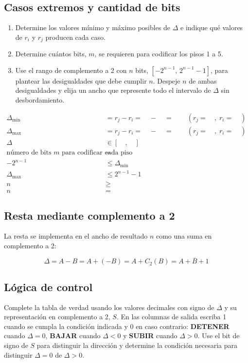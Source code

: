 \documentclass[11pt]{article}
\begin{document}
\subsection{Casos extremos y cantidad de bits}
\label{sec:orgb88aa3c}
\begin{enumerate}
\item Determine los valores mínimo y máximo posibles de \(\Delta\) e indique
qué valores de \(r_i\) y \(r_j\) producen cada caso.
\item Determine cuántos bits, \(m\), se requieren para codificar los pisos
1 a 5.
\item Use el rango de complemento a 2 con \(n\) bits,
\([-2^{n-1},\,2^{n-1}-1]\), para plantear las desigualdades que debe
cumplir \(n\). Despeje \(n\) de ambas desigualdades y elija un ancho que
represente todo el intervalo de \(\Delta\) sin desbordamiento.
\end{enumerate}

\begin{align*}
  \Delta_{\min} &= r_j-r_i = \quad-\quad = \quad
    \quad (r_j=\quad,\;r_i=\quad) \\
  \Delta_{\max} &= r_j-r_i = \quad-\quad = \quad
    \quad (r_j=\quad,\;r_i=\quad) \\
  \Delta &\in [\quad,\quad] \\
  \text{número de bits }m\text{ para codificar cada piso} &= \\
  -2^{n-1} &\leq \Delta_{\min} \\
  \Delta_{\max} &\leq 2^{n-1}-1 \\
  n &\geq \quad \\
  n &= \quad
\end{align*}

\subsection{Resta mediante complemento a 2}
\label{sec:orgf60a915}
La resta se implementa en el ancho de resultado \(n\) como una suma en
complemento a 2:


\begin{equation}
  \label{eq:resta-complemento-dos}
  \Delta = A-B = A+(-B)=A+C_2(B)=A+\overline{B}+1
\end{equation}

\subsection{Lógica de control}
\label{sec:org7a7cb71}
Complete la tabla de verdad usando los valores decimales con signo de
\(\Delta\) y su representación en complemento a 2, \(S\). En las columnas
de salida escriba 1 cuando se cumpla la condición indicada y 0 en caso
contrario: \textbf{DETENER} cuando \(\Delta=0\), \textbf{BAJAR} cuando \(\Delta<0\) y
\textbf{SUBIR} cuando \(\Delta>0\). Use el bit de signo de \(S\) para distinguir
la dirección y determine la condición necesaria para distinguir
\(\Delta=0\) de \(\Delta>0\).
\end{document}
